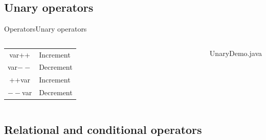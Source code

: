 \documentclass[10pt,compress]{beamer} %
\begin{document}
\subsection{Unary operators}

\begin{frame}{Operators}{Unary operators}
    \begin{columns}
		\centering \begin{tabular}{cl}
		var++ & Increment \\
		var$--$ & Decrement \\
		++var & Increment \\
		$--$var & Decrement \\
		\end{tabular}
		\begin{block}{UnaryDemo.java}
		
		\end{block}
	\end{columns}
\end{frame}

\subsection{Relational and conditional operators}
\end{document}
